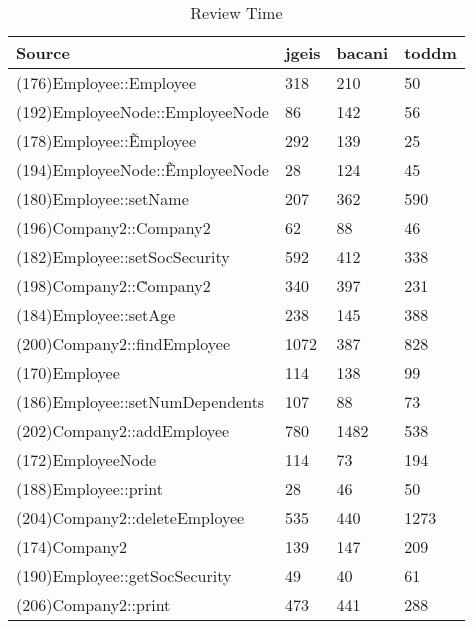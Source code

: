 \begin{table}[hb]
\begin{center}
\begin{tabular}{|l|l|l|l|}
\hline
Source & jgeis & bacani & toddm\\
\hline
(176)Employee::Employee & 318 & 210 & 50\\
(192)EmployeeNode::EmployeeNode & 86 & 142 & 56\\
(178)Employee::\~Employee & 292 & 139 & 25\\
(194)EmployeeNode::\~EmployeeNode & 28 & 124 & 45\\
(180)Employee::setName & 207 & 362 & 590\\
(196)Company2::Company2 & 62 & 88 & 46\\
(182)Employee::setSocSecurity & 592 & 412 & 338\\
(198)Company2::\~Company2 & 340 & 397 & 231\\
(184)Employee::setAge & 238 & 145 & 388\\
(200)Company2::findEmployee & 1072 & 387 & 828\\
(170)Employee & 114 & 138 & 99\\
(186)Employee::setNumDependents & 107 & 88 & 73\\
(202)Company2::addEmployee & 780 & 1482 & 538\\
(172)EmployeeNode & 114 & 73 & 194\\
(188)Employee::print & 28 & 46 & 50\\
(204)Company2::deleteEmployee & 535 & 440 & 1273\\
(174)Company2 & 139 & 147 & 209\\
(190)Employee::getSocSecurity & 49 & 40 & 61\\
(206)Company2::print & 473 & 441 & 288\\
\hline
\end{tabular}
\end{center}
\caption{Review Time}
\end{table}


